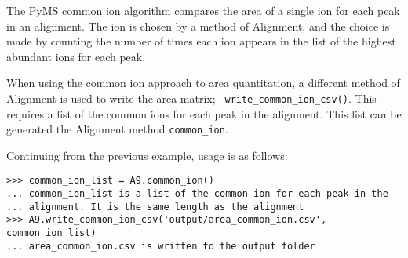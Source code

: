 The PyMS common ion algorithm compares the area of a single ion for each
peak in an alignment. The ion is chosen by a method of Alignment, and the 
choice is made by counting the number of times each ion appears in the
list of the highest abundant ions for each peak.

When using the common ion approach to area quantitation, a different
method of Alignment is used to write the area matrix; {\tt
  write\_common\_ion\_csv()}. This requires a list of the common ions
for each peak in the alignment. This list can be generated the Alignment method {\tt common\_ion}.

Continuing from the previous example, usage is as follows:
\begin{verbatim}
>>> common_ion_list = A9.common_ion()
... common_ion_list is a list of the common ion for each peak in the 
... alignment. It is the same length as the alignment
>>> A9.write_common_ion_csv('output/area_common_ion.csv', common_ion_list)
... area_common_ion.csv is written to the output folder
\end{verbatim}

